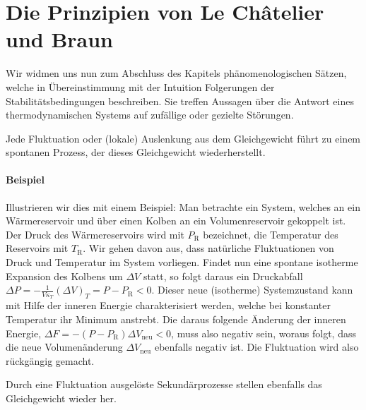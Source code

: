 \section{Die Prinzipien von Le Châtelier und Braun}
Wir widmen uns nun zum Abschluss des Kapitels phänomenologischen Sätzen, welche in Übereinstimmung mit der Intuition Folgerungen der Stabilitätsbedingungen beschreiben. Sie treffen Aussagen über die Antwort eines thermodynamischen Systems auf zufällige oder gezielte Störungen. 

\begin{formal}
	 Jede Fluktuation oder (lokale) Auslenkung aus dem Gleichgewicht führt zu einem spontanen Prozess, der dieses Gleichgewicht wiederherstellt.
\end{formal}
\paragraph*{Beispiel} Illustrieren wir dies mit einem Beispiel: Man betrachte ein System, welches an ein Wärmereservoir und über einen Kolben an ein Volumenreservoir gekoppelt ist. Der Druck des Wärmereservoirs wird mit $P_\mathrm{R}$ bezeichnet, die Temperatur des Reservoirs mit $T_\mathrm{R}$. Wir gehen davon aus, dass natürliche Fluktuationen von Druck und Temperatur im System vorliegen. Findet nun eine spontane isotherme Expansion des Kolbens um $\Delta V$ statt, so folgt daraus ein Druckabfall $\Delta P=-\frac{1}{V\kappa_T}\left(\Delta V\right)_T=P-P_\mathrm{R}<0$. Dieser neue (isotherme) Systemzustand kann mit Hilfe der inneren Energie charakterisiert werden, welche bei konstanter Temperatur ihr Minimum anstrebt. Die daraus folgende Änderung der inneren Energie, $\Delta F=-\left(P-P_\mathrm{R}\right)\Delta V_\mathrm{neu}<0$, muss also negativ sein, woraus folgt, dass die neue Volumenänderung $\Delta V_\mathrm{neu}$ ebenfalls negativ ist. Die Fluktuation wird also rückgängig gemacht. 
\begin{formal}
	 Durch eine Fluktuation ausgelöste Sekundärprozesse stellen ebenfalls das Gleichgewicht wieder her.
\end{formal}
